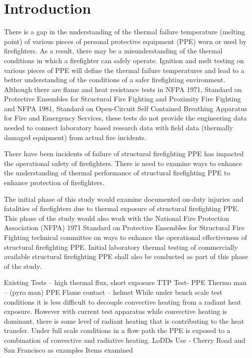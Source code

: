 \documentclass[12pt,oneside]{book}
\begin{document}
\chapter{Introduction}
\setcounter{page}{1}
There is a gap in the understanding of the thermal failure temperature (melting point) of various pieces of personal protective equipment (PPE) worn or used by firefighters.  As a result, there may be a misunderstanding of the thermal conditions in which a firefighter can safely operate.  Ignition and melt testing on various pieces of PPE will define the thermal failure temperatures and lead to a better understanding of the conditions of a safer firefighting environment.  Although there are flame and heat resistance tests in NFPA 1971, Standard on Protective Ensembles for Structural Fire Fighting and Proximity Fire Fighting and NFPA 1981, Standard on Open-Circuit Self Contained Breathing Apparatus for Fire and Emergency Services, these tests do not provide the engineering data needed to connect laboratory based research data with field data (thermally damaged equipment) from actual fire incidents.

There have been incidents of failure of structural firefighting PPE has impacted the operational safety of firefighters.  There is need to examine ways to enhance the understanding of thermal performance of structural firefighting PPE to enhance protection of firefighters.

The initial phase of this study would examine documented on-duty injuries and fatalities of firefighters due to thermal exposure of structural firefighting PPE.  This phase of the study would also work with the National Fire Protection Association (NFPA) 1971 Standard on Protective Ensembles for Structural Fire Fighting technical committee on ways to enhance the operational effectiveness of structural firefighting PPE.  Initial laboratory thermal testing of commercially available structural firefighting PPE shall also be conducted as part of this phase of the study.

Existing Tests – high thermal flux, short exposure
TTP Test- PPE
Thermo man – (pyro man) PPE
Flame contact – helmet
While under bench scale test conditions it is less difficult to decouple convective heating from a radiant heat exposure.  However with current test apparatus while convective heating is dominant, there is some level of radiant heating that is contributing to the heat transfer.
Under full scale conditions in a flow path the PPE is exposed to a combination of convective and radiative heating.
LoDDs
Use - Cherry Road and San Francisco as examples
Items examined
\end{document}
